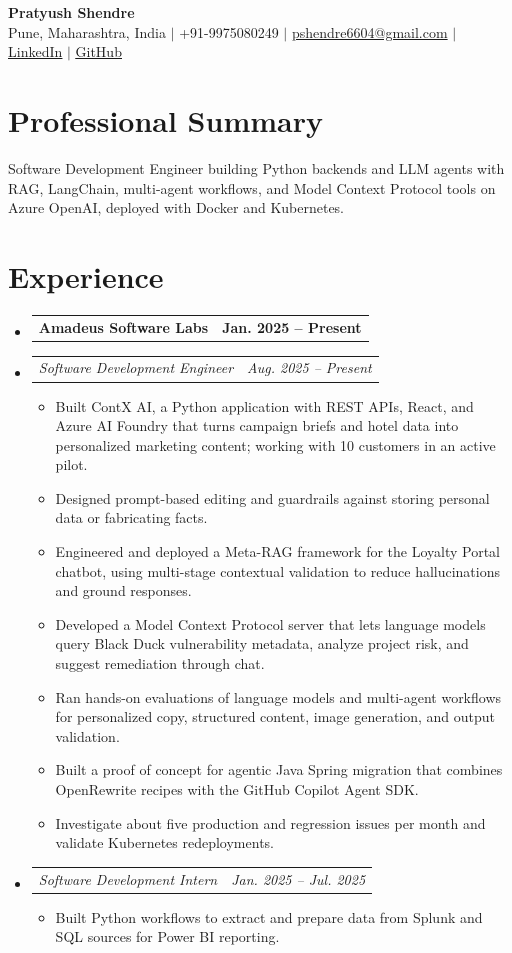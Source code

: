 \documentclass[a4paper,11pt]{article}
\makeatletter
\newcommand{\bulletpoint}[1]{\item\small{#1}}
\newcommand{\company}[2]{\item\begin{tabularx}{\textwidth}{@{}Xr@{}}\textbf{#1}& \textbf{#2}\end{tabularx}\vspace{-4pt}}
\newcommand{\role}[2]{\item\begin{tabularx}{\textwidth}{@{}Xr@{}}\textit{\small #1}&\textit{\small #2}\end{tabularx}\vspace{-5pt}}
\makeatother
\begin{document}
\begin{center}
  {\Large\bfseries Pratyush Shendre}\\[2pt]
  \small Pune, Maharashtra, India $|$ +91-9975080249 $|$
  \href{mailto:pshendre6604@gmail.com}{pshendre6604@gmail.com} $|$
  \href{https://www.linkedin.com/in/pratyush-shendre-2256a7223/}{\underline{LinkedIn}} $|$
  \href{https://github.com/PratyushS04}{\underline{GitHub}}
\end{center}

\section{Professional Summary}
\small Software Development Engineer building Python backends and LLM agents with RAG, LangChain, multi-agent \mbox{workf{}lows}, and Model Context Protocol tools on Azure OpenAI, deployed with Docker and Kubernetes.

\section{Experience}
\begin{itemize}[leftmargin=0in,label={}]
  \company{Amadeus Software Labs}{Jan. 2025 -- Present}
  \role{Software Development Engineer}{Aug. 2025 -- Present}
  \begin{itemize}
    \bulletpoint{Built ContX AI, a Python application with REST APIs, React, and Azure AI Foundry that turns campaign briefs and hotel data into personalized marketing content; working with 10 customers in an active pilot.}
    \bulletpoint{Designed prompt-based editing and guardrails against storing personal data or fabricating facts.}
    \bulletpoint{Engineered and deployed a Meta-RAG framework for the Loyalty Portal chatbot, using multi-stage contextual validation to reduce hallucinations and ground responses.}
    \bulletpoint{Developed a Model Context Protocol server that lets language models query Black Duck vulnerability metadata, analyze project risk, and suggest remediation through chat.}
    \bulletpoint{Ran hands-on evaluations of language models and multi-agent workf{}lows for personalized copy, structured content, image generation, and output validation.}
    \bulletpoint{Built a proof of concept for agentic Java Spring migration that combines OpenRewrite recipes with the GitHub Copilot Agent SDK.}
    \bulletpoint{Investigate about f{}ive production and regression issues per month and validate Kubernetes redeployments.}
  \end{itemize}
  \role{Software Development Intern}{Jan. 2025 -- Jul. 2025}
  \begin{itemize}
    \bulletpoint{Built Python workf{}lows to extract and prepare data from Splunk and SQL sources for Power BI reporting.}
  \end{itemize}
\end{itemize}
\end{document}
